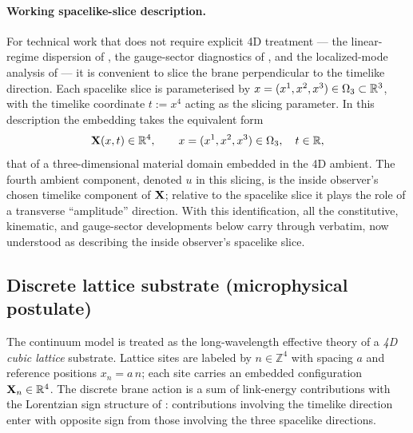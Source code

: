 \paragraph{Working spacelike-slice description.}
For technical work that does not require explicit 4D treatment --- the linear-regime dispersion of , the gauge-sector diagnostics of , and the localized-mode analysis of  --- it is convenient to slice the brane perpendicular to the timelike direction.
Each spacelike slice is parameterised by $x=(x^1,x^2,x^3)\in\Omega_3\subset\mathbb{R}^3$, with the timelike coordinate $t:=x^4$ acting as the slicing parameter.
In this description the embedding takes the equivalent form
\begin{equation}
  \mathbf{X}(x,t)\in\mathbb{R}^4,
  \qquad x=(x^1,x^2,x^3)\in\Omega_3,\quad t\in\mathbb{R},
  \label{eq:fundamental-field-sliced}
\end{equation}
that of a three-dimensional material domain embedded in the 4D ambient.
The fourth ambient component, denoted $u$ in this slicing, is the inside observer's chosen timelike component of $\mathbf{X}$; relative to the spacelike slice it plays the role of a transverse ``amplitude'' direction.
With this identification, all the constitutive, kinematic, and gauge-sector developments below carry through verbatim, now understood as describing the inside observer's spacelike slice.

\subsection{Discrete lattice substrate (microphysical postulate)}
\label{subsec:lattice-substrate}

The continuum model is treated as the long-wavelength effective theory of a \emph{4D cubic lattice} substrate.
Lattice sites are labeled by $n\in\mathbb{Z}^4$ with spacing $a$ and reference positions $x_n=a\,n$; each site carries an embedded configuration $\mathbf{X}_n\in\mathbb{R}^4$.
The discrete brane action is a sum of link-energy contributions with the Lorentzian sign structure of : contributions involving the timelike direction enter with opposite sign from those involving the three spacelike directions.

